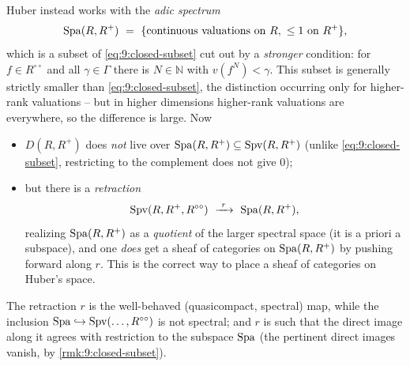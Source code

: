 \begin{remark}
\label{rmk:9:huber-spa}
Huber \cite{Huber_1994} instead works with the \emph{adic spectrum}
\begin{equation*}
\operatorname{Spa}(R,R^{+})\ =\ \{\text{continuous valuations on }R,\ \le 1\text{ on }R^{+}\},
\end{equation*}
which is a subset of \eqref{eq:9:closed-subset} cut out by a \emph{stronger}
condition: for $f\in R^{\circ\circ}$ and all $\gamma\in\Gamma$ there is
$N\in\mathbb N$ with $v(f^{N})<\gamma$. This subset is generally strictly smaller
than \eqref{eq:9:closed-subset}, the distinction occurring only for higher-rank
valuations -- but in higher dimensions higher-rank valuations are everywhere,
so the difference is large. Now
\begin{itemize}
\item $D(R,R^{+})$ does \emph{not} live over $\operatorname{Spa}(R,R^{+})\subseteq
\operatorname{Spv}(R,R^{+})$ (unlike \eqref{eq:9:closed-subset}, restricting to the complement
does not give $0$);
\item but there is a \emph{retraction}
\begin{equation*}
\Spv(R,R^{+},R^{\circ\circ})\ \xrightarrow{\ r\ }\ \Spa(R,R^{+}),
\end{equation*}
realizing $\operatorname{Spa}(R,R^{+})$ as a \emph{quotient} of the larger spectral space (it
is a priori a subspace), and one \emph{does} get a sheaf of categories on
$\operatorname{Spa}(R,R^{+})$ by pushing forward along $r$. This is the correct way to place a
sheaf of categories on Huber's space.
\end{itemize}
The retraction $r$ is the well-behaved (quasicompact, spectral) map, while the
inclusion $\operatorname{Spa}\hookrightarrow\operatorname{Spv}(\dots,R^{\circ\circ})$ is not spectral; and
$r$ is such that the direct image along it agrees with restriction to the
subspace $\operatorname{Spa}$ (the pertinent direct images vanish, by
\cref{rmk:9:closed-subset}).
\end{remark}

